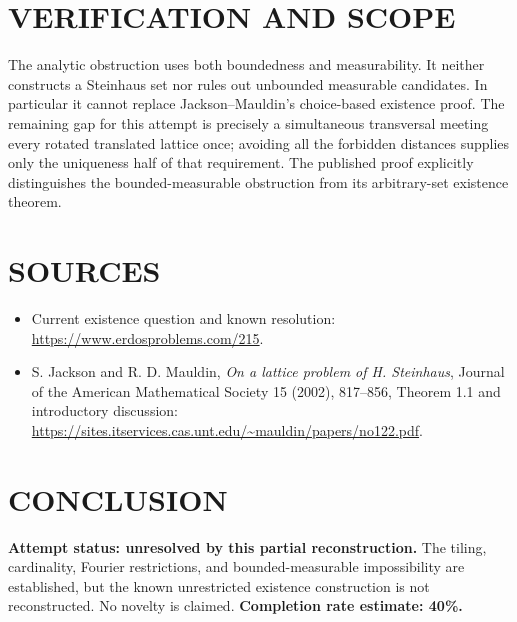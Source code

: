 \section{VERIFICATION AND SCOPE}
The analytic obstruction uses both boundedness and measurability. It neither constructs a Steinhaus set nor rules out unbounded measurable candidates. In particular it cannot replace Jackson--Mauldin's choice-based existence proof. The remaining gap for this attempt is precisely a simultaneous transversal meeting every rotated translated lattice once; avoiding all the forbidden distances supplies only the uniqueness half of that requirement. The published proof explicitly distinguishes the bounded-measurable obstruction from its arbitrary-set existence theorem.

\section{SOURCES}
\begin{itemize}
\item Current existence question and known resolution: \url{https://www.erdosproblems.com/215}.
\item S. Jackson and R. D. Mauldin, \emph{On a lattice problem of H. Steinhaus}, Journal of the American Mathematical Society 15 (2002), 817--856, Theorem 1.1 and introductory discussion: \url{https://sites.itservices.cas.unt.edu/~mauldin/papers/no122.pdf}.
\end{itemize}
\section{CONCLUSION}
\textbf{Attempt status: unresolved by this partial reconstruction.} The tiling, cardinality, Fourier restrictions, and bounded-measurable impossibility are established, but the known unrestricted existence construction is not reconstructed. No novelty is claimed.
\textbf{Completion rate estimate: 40\%.}

